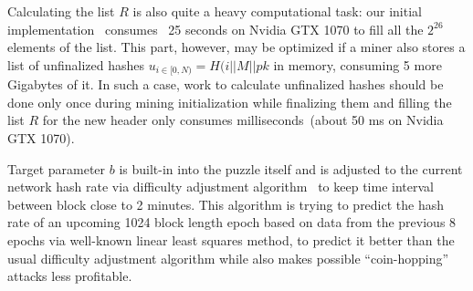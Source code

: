 Calculating the list $R$ is also quite a heavy computational task: our initial implementation~\cite{ergoMiner}
consumes ~25 seconds on Nvidia GTX 1070 to fill all the $2^{26}$ elements of the list.
This part, however, may be optimized if a miner also stores a list of unfinalized hashes $u_{i \in [0,N)}=H(i||M||pk$
in memory, consuming 5 more Gigabytes of it. In such a case, work to calculate unfinalized hashes should
be done only once during mining initialization while finalizing them and filling the list $R$
for the new header only consumes milliseconds~(about 50 ms on Nvidia GTX 1070).

Target parameter $b$ is built-in into the puzzle itself
and is adjusted to the current network hash rate via difficulty adjustment
algorithm~\cite{meshkov2017short} to keep time interval between block close to 2 minutes.
This algorithm is trying to predict the hash rate of an upcoming 1024 block length epoch
based on data from the previous 8 epochs via well-known linear least squares method,
to predict it better than the usual difficulty adjustment algorithm while also makes possible
``coin-hopping'' attacks less profitable. 
